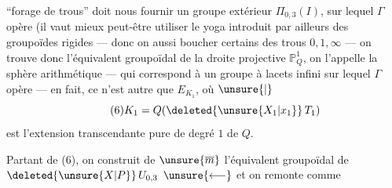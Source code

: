 ``forage de trous'' doit nous fournir un groupe extérieur $\Pi_{0,3}(I)$,  sur lequel $\Gamma$ opère (il vaut mieux peut-être utiliser le yoga introduit par ailleurs des groupoïdes rigides — donc on   aussi boucher certains des trous $0,1,\infty$ — on trouve donc l'équivalent groupoïdal de la  droite projective $\mathbb P^1_Q$, on l'appelle la sphère arithmétique — qui correspond à un groupe  à lacets infini sur lequel $\Gamma$ opère — en fait, ce n'est autre que $E_{K_1}$, où $\unsure{\vert}$
\[
\tag{6}K_1=Q(\deleted{\unsure{X_1|x_1}}\,T_1)
\]
est l'extension transcendante pure  de degré $1$ de $Q$.

Partant de (6), on construit de $\unsure{\overline m}$ l'équivalent groupoïdal de $\deleted{\unsure{X|P}}\,U_{0,3}$ $\unsure{\longleftarrow}$ et on remonte comme

